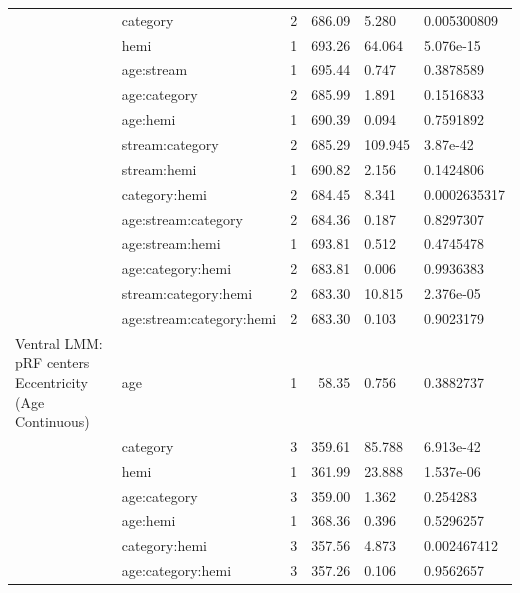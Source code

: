 \begin{table}
\begin{tabular}{llrrll}
 & category & 2 & 686.09 & 5.280 & 0.005300809\\
\addlinespace
 & hemi & 1 & 693.26 & 64.064 & 5.076e-15\\
 & age:stream & 1 & 695.44 & 0.747 & 0.3878589\\
 & age:category & 2 & 685.99 & 1.891 & 0.1516833\\
 & age:hemi & 1 & 690.39 & 0.094 & 0.7591892\\
 & stream:category & 2 & 685.29 & 109.945 & 3.87e-42\\
\addlinespace
 & stream:hemi & 1 & 690.82 & 2.156 & 0.1424806\\
 & category:hemi & 2 & 684.45 & 8.341 & 0.0002635317\\
 & age:stream:category & 2 & 684.36 & 0.187 & 0.8297307\\
 & age:stream:hemi & 1 & 693.81 & 0.512 & 0.4745478\\
 & age:category:hemi & 2 & 683.81 & 0.006 & 0.9936383\\
\addlinespace
 & stream:category:hemi & 2 & 683.30 & 10.815 & 2.376e-05\\
 & age:stream:category:hemi & 2 & 683.30 & 0.103 & 0.9023179\\
Ventral LMM: pRF centers Eccentricity (Age Continuous) & age & 1 & 58.35 & 0.756 & 0.3882737\\
 & category & 3 & 359.61 & 85.788 & 6.913e-42\\
 & hemi & 1 & 361.99 & 23.888 & 1.537e-06\\
\addlinespace
 & age:category & 3 & 359.00 & 1.362 & 0.254283\\
 & age:hemi & 1 & 368.36 & 0.396 & 0.5296257\\
 & category:hemi & 3 & 357.56 & 4.873 & 0.002467412\\
 & age:category:hemi & 3 & 357.26 & 0.106 & 0.9562657\\
\bottomrule
\end{tabular}
\end{table}
